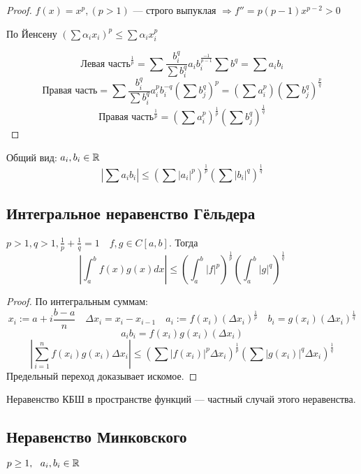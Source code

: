 \begin{proof}
    $f(x)=x^p, (p>1)$ --- строго выпуклая $\Rightarrow f''=p(p-1)x^{p-2}>0$
    
    По Йенсену $\left(\sum \alpha_i x_i\right)^p\leq \sum \alpha_i x_i^p$


    $$\text{Левая часть}^{\frac{1}{p}}=\sum\frac{b_i^q}{\sum b_i^q} a_ib_i^{\frac{-1}{p-1}} \sum b^q=\sum a_ib_i$$
    $$\text{Правая часть}=\sum\frac{b_i^q}{\sum b_i^q} a_i^pb_i^{-q}\left(\sum b_j^q\right)^p=\left(\sum a_i^p\right)\left(\sum b_j^q\right)^\frac{p}{q}$$
    $$\text{Правая часть}^{\frac{1}{p}}=\left(\sum a_i^p\right)^{\frac{1}{p}}\left(\sum b_j^q\right)^\frac{1}{q}$$
\end{proof}

Общий вид: $a_i, b_i\in\mathbb{R}$
$$\left|\sum a_ib_i\right|\leq \left(\sum |a_i|^p\right)^{\frac{1}{p}}\left(\sum |b_i|^q\right)^{\frac{1}{q}}$$

\subsection{Интегральное неравенство Гёльдера}

$p>1, q>1, \frac{1}{p}+\frac{1}{q}=1 \quad f, g\in C[a,b]$. Тогда
$$\left|\int_a^b f(x)g(x)dx\right|\leq\left(\int_a^b |f|^p\right)^{\frac{1}{p}}\left(\int_a^b |g|^q\right)^{\frac{1}{q}}$$
\begin{proof}
    По интегральным суммам:
    $$x_i:=a+i\frac{b-a}{n} \quad \Delta x_i = x_i-x_{i-1} \quad a_i:=f(x_i)(\Delta x_i)^{\frac{1}{p}} \quad b_i=g(x_i)(\Delta x_i)^{\frac{1}{q}}$$
    $$a_ib_i=f(x_i)g(x_i)(\Delta x_i)$$
    $$\left|\sum_{i=1}^n f(x_i)g(x_i)\Delta x_i\right| \leq \left(\sum |f(x_i)|^p \Delta x_i\right)^{\frac{1}{p}}\left(\sum |g(x_i)|^q \Delta x_i\right)^{\frac{1}{q}}$$
    Предельный переход доказывает искомое.
\end{proof}

Неравенство КБШ в пространстве функций --- частный случай этого неравенства.

\subsection{Неравенство Минковского}

$p\geq 1,\ \ a_i,b_i\in\mathbb{R}$

